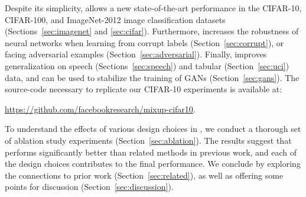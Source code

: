 Despite its simplicity, \mixup{} allows a new state-of-the-art performance in
the CIFAR-10, CIFAR-100, and ImageNet-2012 image classification datasets
(Sections~\ref{sec:imagenet} and \ref{sec:cifar}). Furthermore, \mixup{}
increases the robustness of neural networks when learning from corrupt labels
(Section~\ref{sec:corrupt}), or facing adversarial examples
(Section~\ref{sec:adversarial}).  Finally, \mixup{} improves generalization on
speech (Sections~\ref{sec:speech}) and tabular (Section~\ref{sec:uci}) data,
and can be used to stabilize the training of GANs (Section~\ref{sec:gans}). The
source-code necessary to replicate our CIFAR-10 experiments is available at:
\begin{center}
\url{https://github.com/facebookresearch/mixup-cifar10}.
\end{center}
To understand the effects of various design choices in \mixup{}, we conduct a thorough set of ablation study experiments (Section~\ref{sec:ablation}). The results suggest that \mixup{} performs significantly better than related methods in previous work, and each of the design choices contributes to the final performance. We conclude by exploring the connections to prior work
(Section~\ref{sec:related}), as well as offering some points for discussion
(Section~\ref{sec:discussion}).
